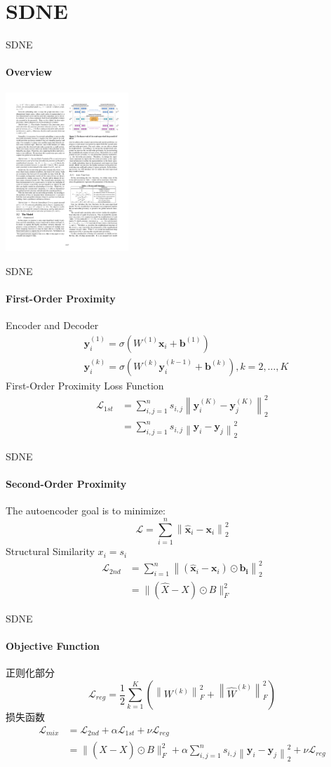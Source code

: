 \documentclass{beamer}
\begin{document}
\section{SDNE}
\begin{frame}{SDNE}
    \framesubtitle{Overview}
    \centering\includegraphics[height=6cm]{SDNE.pdf}
\end{frame}
\begin{frame}{SDNE}
    \framesubtitle{First-Order Proximity}
    Encoder and Decoder
    $$
    \begin{aligned}
    &\mathbf{y}_{i}^{(1)}=\sigma\left(W^{(1)} \mathbf{x}_{i}+\mathbf{b}^{(1)}\right) \\
    &\mathbf{y}_{i}^{(k)}=\sigma\left(W^{(k)} \mathbf{y}_{i}^{(k-1)}+\mathbf{b}^{(k)}\right), k=2, \ldots, K
    \end{aligned}
    $$
    First-Order Proximity Loss Function
    $$
    \begin{aligned}
    \mathcal{L}_{1 s t} &=\sum_{i, j=1}^{n} s_{i, j}\left\|\mathbf{y}_{i}^{(K)}-\mathbf{y}_{j}^{(K)}\right\|_{2}^{2} \\
    &=\sum_{i, j=1}^{n} s_{i, j}\left\|\mathbf{y}_{i}-\mathbf{y}_{j}\right\|_{2}^{2}
    \end{aligned}
    $$
\end{frame}
\begin{frame}{SDNE}
    \framesubtitle{Second-Order Proximity}
    The autoencoder goal is to minimize:
    $$
    \mathcal{L}=\sum_{i=1}^{n}\left\|\hat{\mathbf{x}}_{i}-\mathbf{x}_{i}\right\|_{2}^{2}
    $$
    {Structural Similarity $x_i=s_i$} 
    $$
    \begin{aligned}
    \mathcal{L}_{2 n d} &=\sum_{i=1}^{n}\left\|\left(\hat{\mathbf{x}}_{i}-\mathbf{x}_{i}\right) \odot \mathbf{b}_{\mathbf{i}}\right\|_{2}^{2} \\
    &=\|(\hat{X}-X) \odot B\|_{F}^{2}
    \end{aligned}
    $$
\end{frame}
\begin{frame}{SDNE}
    \framesubtitle{Objective Function}
    正则化部分
    $$
    \mathcal{L}_{r e g}=\frac{1}{2} \sum_{k=1}^{K}\left(\left\|W^{(k)}\right\|_{F}^{2}+\left\|\hat{W}^{(k)}\right\|_{F}^{2}\right)
    $$
    损失函数
    $$
    \begin{aligned}
    \mathcal{L}_{m i x} &=\mathcal{L}_{2 n d}+\alpha \mathcal{L}_{1 s t}+\nu \mathcal{L}_{r e g} \\
    &=\|(\hat{X}-X) \odot B\|_{F}^{2}+\alpha \sum_{i, j=1}^{n} s_{i, j}\left\|\mathbf{y}_{i}-\mathbf{y}_{j}\right\|_{2}^{2}+\nu \mathcal{L}_{r e g}
    \end{aligned}
    $$
\end{frame}
\end{document}
